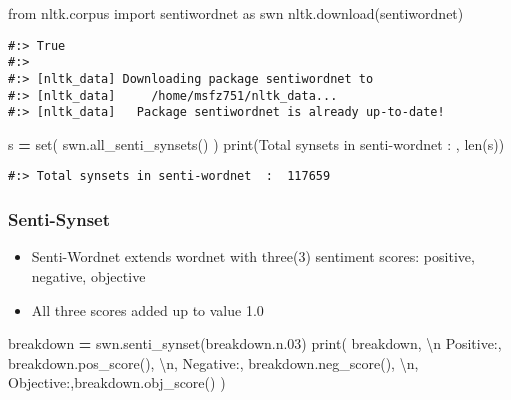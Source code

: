 \documentclass[
]{book}
\newenvironment{Shaded}{\begin{snugshade}}{\end{snugshade}}
\newcommand{\BuiltInTok}[1]{#1}
\newcommand{\CharTok}[1]{\textcolor[rgb]{0.5,0.5,0.5}{#1}}
\newcommand{\ImportTok}[1]{#1}
\newcommand{\NormalTok}[1]{#1}
\newcommand{\OperatorTok}[1]{\textcolor[rgb]{0.43,0.43,0.43}{\textbf{#1}}}
\newcommand{\StringTok}[1]{\textcolor[rgb]{0.5,0.5,0.5}{#1}}
\providecommand{\tightlist}{%
  \setlength{\itemsep}{0pt}\setlength{\parskip}{0pt}}
\begin{document}
\begin{Shaded}
\begin{Highlighting}[]
\ImportTok{from}\NormalTok{ nltk.corpus }\ImportTok{import}\NormalTok{ sentiwordnet }\ImportTok{as}\NormalTok{ swn}
\NormalTok{nltk.download(}\StringTok{\textquotesingle{}sentiwordnet\textquotesingle{}}\NormalTok{)}
\end{Highlighting}
\end{Shaded}

\begin{verbatim}
#:> True
#:> 
#:> [nltk_data] Downloading package sentiwordnet to
#:> [nltk_data]     /home/msfz751/nltk_data...
#:> [nltk_data]   Package sentiwordnet is already up-to-date!
\end{verbatim}

\begin{Shaded}
\begin{Highlighting}[]
\NormalTok{s }\OperatorTok{=} \BuiltInTok{set}\NormalTok{( swn.all\_senti\_synsets() )}
\BuiltInTok{print}\NormalTok{(}\StringTok{\textquotesingle{}Total synsets in senti{-}wordnet  : \textquotesingle{}}\NormalTok{ ,   }\BuiltInTok{len}\NormalTok{(s))}
\end{Highlighting}
\end{Shaded}

\begin{verbatim}
#:> Total synsets in senti-wordnet  :  117659
\end{verbatim}

\hypertarget{senti-synset}{%
\subsubsection{Senti-Synset}\label{senti-synset}}

\begin{itemize}
\tightlist
\item
  Senti-Wordnet extends wordnet with three(3) sentiment scores: positive, negative, objective\\
\item
  All three scores added up to value 1.0
\end{itemize}

\begin{Shaded}
\begin{Highlighting}[]
\NormalTok{breakdown }\OperatorTok{=}\NormalTok{ swn.senti\_synset(}\StringTok{\textquotesingle{}breakdown.n.03\textquotesingle{}}\NormalTok{)}
\BuiltInTok{print}\NormalTok{(}
\NormalTok{  breakdown, }\StringTok{\textquotesingle{}}\CharTok{\textbackslash{}n}\StringTok{\textquotesingle{}}
  \StringTok{\textquotesingle{}Positive:\textquotesingle{}}\NormalTok{, breakdown.pos\_score(), }\StringTok{\textquotesingle{}}\CharTok{\textbackslash{}n}\StringTok{\textquotesingle{}}\NormalTok{,}
  \StringTok{\textquotesingle{}Negative:\textquotesingle{}}\NormalTok{, breakdown.neg\_score(), }\StringTok{\textquotesingle{}}\CharTok{\textbackslash{}n}\StringTok{\textquotesingle{}}\NormalTok{,}
  \StringTok{\textquotesingle{}Objective:\textquotesingle{}}\NormalTok{,breakdown.obj\_score()}
\NormalTok{)}
\end{Highlighting}
\end{Shaded}
\end{document}
